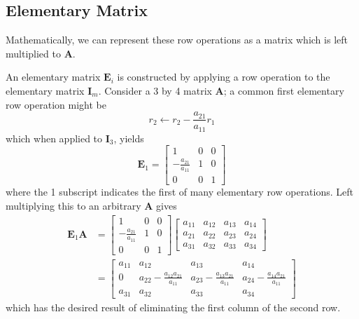 \documentclass{article}
\begin{document}
\subsection{Elementary Matrix}
Mathematically, we can represent these row operations as a matrix which
is left multiplied to \(\symbf{A}\).
\begin{definition}
    An elementary matrix \(\symbf{E}_i\) is constructed by applying a row operation to the elementary matrix \(\symbf{I}_m\).
    Consider a 3 by 4 matrix \(\symbf{A}\); a common first elementary row operation might be
    \begin{equation*}
        r_2 \leftarrow r_2 - \frac{a_{21}}{a_{11}} r_1
    \end{equation*}
    which when applied to \(\symbf{I}_3\), yields
    \begin{equation*}
        \symbf{E}_1 =
        \begin{bmatrix}
            1                      & 0 & 0 \\
            -\frac{a_{21}}{a_{11}} & 1 & 0 \\
            0                      & 0 & 1
        \end{bmatrix}
    \end{equation*}
    where the 1 subscript indicates the first of many elementary row operations.
    Left multiplying this to an arbitrary \(\symbf{A}\) gives
    \begin{align*}
        \symbf{E}_1 \symbf{A} & =
        \begin{bmatrix}
            1                      & 0 & 0 \\
            -\frac{a_{21}}{a_{11}} & 1 & 0 \\
            0                      & 0 & 1
        \end{bmatrix}
        \begin{bmatrix}
            a_{11} & a_{12} & a_{13} & a_{14} \\
            a_{21} & a_{22} & a_{23} & a_{24} \\
            a_{31} & a_{32} & a_{33} & a_{34}
        \end{bmatrix}
        \\
                              & =
        \begin{bmatrix}
            a_{11} & a_{12}                              & a_{13}                              & a_{14}                              \\
            0      & a_{22}-\frac{a_{12} a_{21}}{a_{11}} & a_{23}-\frac{a_{13} a_{21}}{a_{11}} & a_{24}-\frac{a_{14} a_{21}}{a_{11}} \\
            a_{31} & a_{32}                              & a_{33}                              & a_{34}
        \end{bmatrix}
    \end{align*}
    which has the desired result of eliminating the first column of the second row.
\end{definition}
\end{document}
